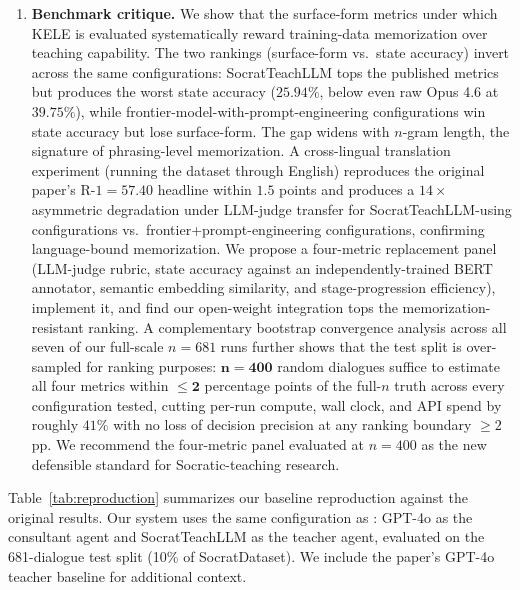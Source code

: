 \documentclass[11pt]{article}
\begin{document}
\begin{enumerate}
    \item \textbf{Benchmark critique.} We show that the surface-form metrics under which KELE is evaluated systematically reward training-data memorization over teaching capability. The two rankings (surface-form vs.\ state accuracy) invert across the same configurations: SocratTeachLLM tops the published metrics but produces the worst state accuracy ($25.94\%$, below even raw Opus 4.6 at $39.75\%$), while frontier-model-with-prompt-engineering configurations win state accuracy but lose surface-form. The gap widens with $n$-gram length, the signature of phrasing-level memorization. A cross-lingual translation experiment (running the dataset through English) reproduces the original paper's $\text{R-1}=57.40$ headline within $1.5$ points and produces a $14\times$ asymmetric degradation under LLM-judge transfer for SocratTeachLLM-using configurations vs.\ frontier+prompt-engineering configurations, confirming language-bound memorization. We propose a four-metric replacement panel (LLM-judge rubric, state accuracy against an independently-trained BERT annotator, semantic embedding similarity, and stage-progression efficiency), implement it, and find our open-weight integration tops the memorization-resistant ranking. A complementary bootstrap convergence analysis across all seven of our full-scale $n{=}681$ runs further shows that the test split is over-sampled for ranking purposes: $\boldsymbol{n{=}400}$ random dialogues suffice to estimate all four metrics within $\boldsymbol{\leq 2}$ percentage points of the full-$n$ truth across every configuration tested, cutting per-run compute, wall clock, and API spend by roughly $41\%$ with no loss of decision precision at any ranking boundary $\geq 2$ pp. We recommend the four-metric panel evaluated at $n{=}400$ as the new defensible standard for Socratic-teaching research.
\end{enumerate}

Table~\ref{tab:reproduction} summarizes our baseline reproduction against the original results. Our system uses the same configuration as \citet{peng2025kele}: GPT-4o as the consultant agent and SocratTeachLLM as the teacher agent, evaluated on the 681-dialogue test split (10\% of SocratDataset). We include the paper's GPT-4o teacher baseline for additional context.
\end{document}
